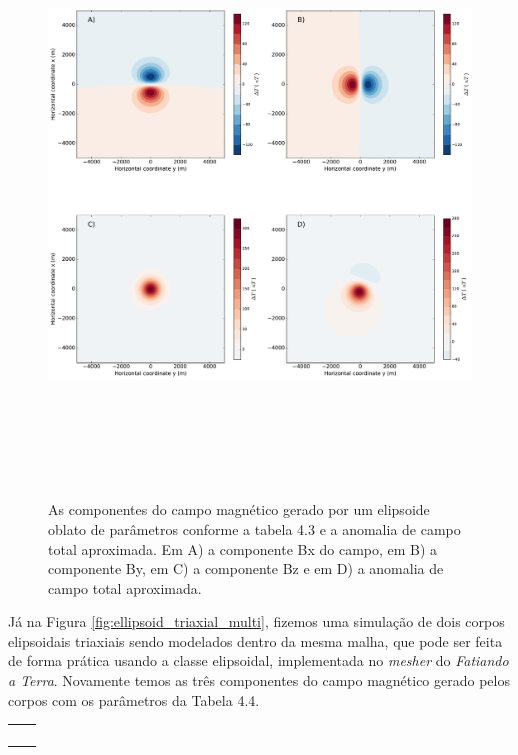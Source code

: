 \begin{figure}[hbt!]
	\centering \includegraphics[width=16cm,height=16cm]{figures/ellipsoid_oblate}
	\caption[As componentes do campo magnético gerado por um elipsoide oblato e a anomalia de campo total aproximada.]{As componentes 
		do campo magnético gerado por um elipsoide oblato de parâmetros conforme a tabela 4.3 e a anomalia de campo total aproximada. Em A) a componente Bx do campo, em B) a componente By, em C) a componente Bz e em D) a anomalia de campo total aproximada.}
	\label{fig:oblate}
\end{figure}

Já na Figura \ref{fig:ellipsoid_triaxial_multi}, fizemos uma simulação de dois corpos elipsoidais triaxiais sendo modelados dentro da mesma malha, que pode ser feita de forma prática usando a classe elipsoidal, implementada no \textit{mesher} do \textit{Fatiando a Terra}. Novamente temos as três componentes do campo magnético gerado pelos corpos com os parâmetros da Tabela 4.4.

\begin{table}[h!]
	\begin{center}
		\begin{tabular}{lc}
			
			&  \\
			&  \\
			&  \\
			&  \\
		\end{tabular}
	\end{center}
\end{table}

